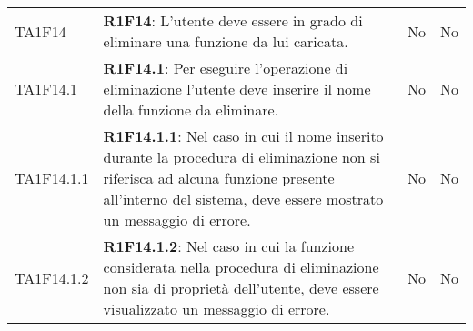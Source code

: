 \begin{longtable}{ 
		>{\centering}p{} 
		>{}p{} 
		>{\centering}p{}
		>{\centering}p{} }
	TA1F14 & \textbf{R1F14}: L'utente deve essere in grado di eliminare una funzione da lui caricata. & No & No \tabularnewline
	TA1F14.1 & \textbf{R1F14.1}: Per eseguire l'operazione di eliminazione l'utente deve inserire 
		il nome della funzione da eliminare. 										& No & No \tabularnewline
	TA1F14.1.1 & \textbf{R1F14.1.1}: Nel caso in cui il nome inserito durante la procedura di eliminazione
		non si riferisca ad alcuna funzione presente all'interno del sistema, deve 
		essere mostrato un messaggio di errore.										& No & No \tabularnewline
	TA1F14.1.2 & \textbf{R1F14.1.2}: Nel caso in cui la funzione considerata nella procedura di eliminazione
		non sia di proprietà dell'utente, deve essere visualizzato un messaggio 
		di errore.																	& No & No \tabularnewline

\end{longtable}
